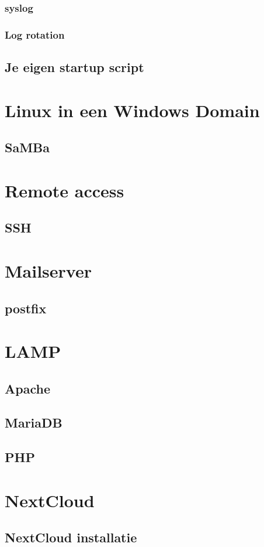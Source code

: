 \documentclass[a4paper,12pt,twoside,openright,titlepage]{book}
\begin{document}
\subsection{syslog}
\subsection{Log rotation}
\section{Je eigen startup script}


\chapter{Linux in een Windows Domain}
\section{SaMBa}

\chapter{Remote access}
\section{SSH}

\chapter{Mailserver}
\section{postfix}

\chapter{LAMP}

\section{Apache}


\section{MariaDB}

\section{PHP}


\chapter{NextCloud}

\section{NextCloud installatie}



\printindex
\end{document}
